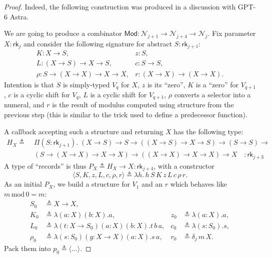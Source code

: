 \documentclass{article}
\theoremstyle{definition}
\theoremstyle{remark}
\begin{document}
\begin{proof}
    Indeed, the following construction was produced in
    a discussion with GPT-6 Astra.

    We are going to produce a combinator $\mathsf{Mod}:
    \mathcal{N}_{j+1}\to\mathcal{N}_{j+4}\to
    \mathcal{N}_j$. Fix parameter $X:\mathsf{rk}_j$ and
    consider the following signature for abstract
    $S:\mathsf{rk}_{j+1}$:
    \[\begin{array}{ll}
        K:X\to S, &z:S,\\
        L:(X\to S)\to X\to S, &c:S\to S,\\
        \rho:S\to(X\to X)\to X\to X,
        &r:(X\to X)\to(X\to X).
    \end{array}\]
    Intention is that $S$ is simply-typed $V_q$ for
    $X$, $z$ is its ``zero'', $K$ is a ``zero'' for
    $V_{q+1}$, $c$ is a cyclic shift for $V_q$, $L$ is
    a cyclic shift for $V_{q+1}$, $\rho$ converts a
    selector into a numeral, and $r$ is the result of
    modulus computed using structure from the previous
    step (this is similar to the trick used to define a
    predecessor function).

    A callback accepting such a structure and returning
    $X$ has the following type:
    \begin{align*}
        H_X \triangleq\;&\Pi(S:\mathsf{rk}_{j+1}).\;
        (X\to S)\to S\to((X\to S)\to X\to S)\to(S\to S)
        \to\\&(S\to (X\to X)\to X\to X)\to
        ((X\to X)\to X\to X)\to X
        \quad :\mathsf{rk}_{j+3}
    \end{align*}
    A type of ``records'' is thus
    $P_X\triangleq H_X\to X:\mathsf{rk}_{j+4}$, with a
    constructor
    \[
        \langle S,K,z,L,c,\rho,r\rangle\triangleq
        \lambda h.\,h\,S\,K\,z\,L\,c\,\rho\,r.
    \]
    As an initial $P_X$, we build a structure for
    $V_1$ and an $r$ which behaves like
    $m\,\mathrm{mod}\,0=m$:
    \begin{align*}
        S_0&\triangleq X\to X,\\
        K_0&\triangleq\lambda(a:X)(b:X).a,&
        z_0&\triangleq\lambda(a:X).a,\\
        L_0&\triangleq\lambda(t:X\to S_0)(a:X)(b:X).
            t\,b\,a,&
        c_0&\triangleq\lambda(s:S_0).s,\\
        \rho_0&\triangleq
            \lambda(s:S_0)(g:X\to X)(a:X).s\,a,&
        r_0&\triangleq\delta_j\,m\,X.
    \end{align*}
    Pack them into $p_0\triangleq\langle\ldots\rangle$.


\end{proof}
\end{document}
